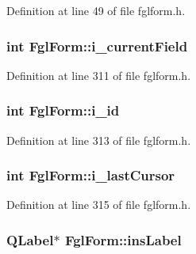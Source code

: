 Definition at line 49 of file fglform.h.

\hypertarget{classFglForm_ae7e903902c63ce3179656df4b684038f}{
\subsubsection[{i\_\-currentField}]{\setlength{\rightskip}{0pt plus 5cm}int {\bf FglForm::i\_\-currentField}}}
\label{classFglForm_ae7e903902c63ce3179656df4b684038f}


Definition at line 311 of file fglform.h.

\hypertarget{classFglForm_a6142cd4363f16562e52631f1987b46c3}{
\subsubsection[{i\_\-id}]{\setlength{\rightskip}{0pt plus 5cm}int {\bf FglForm::i\_\-id}}}
\label{classFglForm_a6142cd4363f16562e52631f1987b46c3}


Definition at line 313 of file fglform.h.

\hypertarget{classFglForm_a9f622b4a17fcad8c785e119d19abe326}{
\subsubsection[{i\_\-lastCursor}]{\setlength{\rightskip}{0pt plus 5cm}int {\bf FglForm::i\_\-lastCursor}}}
\label{classFglForm_a9f622b4a17fcad8c785e119d19abe326}


Definition at line 315 of file fglform.h.

\hypertarget{classFglForm_a72467aa7c8750f7075b7ba7fc67a29bb}{
\subsubsection[{insLabel}]{\setlength{\rightskip}{0pt plus 5cm}QLabel$\ast$ {\bf FglForm::insLabel}}}
\label{classFglForm_a72467aa7c8750f7075b7ba7fc67a29bb}


